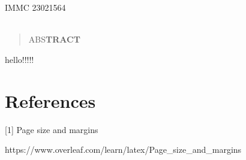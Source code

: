 \documentclass[12pt]{article}
\begin{document}
\newpage

\begin{center}
	\Huge
	~\\
	~\\
	IMMC 23021564
	~\\
	~\\
	\normalsize
\end{center}

\begin{abstract}
	ABS\textbf{TRACT}
\end{abstract}

\newpage
\tableofcontents
\newpage

hello!!!!!


\section{References}

 [1] Page size and margins

https://www.overleaf.com/learn/latex/Page\_size\_and\_margins
\end{document}
